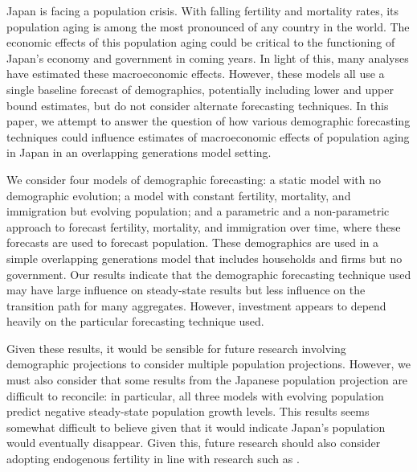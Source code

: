 \documentclass[10pt]{article}
\renewcommand{\thesection}{\arabic{section}}
\renewcommand{\section}[2][]{\oldsection[#1]{#2}\index{#1}\label{sec:\thesection}}
\numberwithin{equation}{subsection}
\begin{document}

\section{Conclusion}

\par Japan is facing a population crisis. With falling fertility and mortality rates, its population aging is among the most pronounced of any country in the world. The economic effects of this population aging could be critical to the functioning of Japan's economy and government in coming years. In light of this, many analyses have estimated these macroeconomic effects. However, these models all use a single baseline forecast of demographics, potentially including lower and upper bound estimates, but do not consider alternate forecasting techniques. In this paper, we attempt to answer the question of how various demographic forecasting techniques could influence estimates of macroeconomic effects of population aging in Japan in an overlapping generations model setting.

\par We consider four models of demographic forecasting: a static model with no demographic evolution; a model with constant fertility, mortality, and immigration but evolving population; and a parametric and a non-parametric approach to forecast fertility, mortality, and immigration over time, where these forecasts are used to forecast population. These demographics are used in a simple overlapping generations model that includes households and firms but no government. Our results indicate that the demographic forecasting technique used may have large influence on steady-state results but less influence on the transition path for many aggregates. However, investment appears to depend heavily on the particular forecasting technique used.

\par Given these results, it would be sensible for future research involving demographic projections to consider multiple population projections. However, we must also consider that some results from the Japanese population projection are difficult to reconcile: in particular, all three models with evolving population predict negative steady-state population growth levels. This results seems somewhat difficult to believe given that it would indicate Japan's population would eventually disappear. Given this, future research should also consider adopting endogenous fertility in line with research such as \cite{BB1989}.
\end{document}
